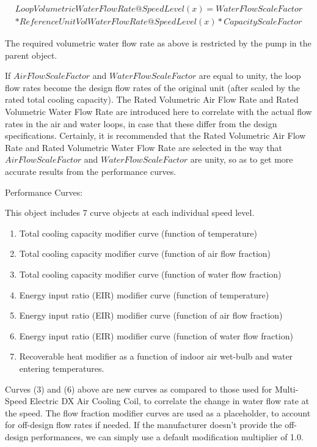 \begin{equation}
\begin{split}
  LoopVolumetricWaterFlowRate@SpeedLevel\left( x \right) = WaterFlowScaleFactor \\
  * ReferenceUnitVolWaterFlowRate@SpeedLevel(x) * CapacityScaleFactor
\end{split}
\end{equation}

The required volumetric water flow rate as above is restricted by the pump in the parent object.

If \(AirFlowScaleFactor\) and \(WaterFlowScaleFactor\) are equal to unity, the loop flow rates become the design flow rates of the original unit (after scaled by the rated total cooling capacity). The Rated Volumetric Air Flow Rate and Rated Volumetric Water Flow Rate are introduced here to correlate with the actual flow rates in the air and water loops, in case that these differ from the design specifications. Certainly, it is recommended that the Rated Volumetric Air Flow Rate and Rated Volumetric Water Flow Rate are selected in the way that \(AirFlowScaleFactor\) and \(WaterFlowScaleFactor\) are unity, so as to get more accurate results from the performance curves.

Performance Curves:

This object includes 7 curve objects at each individual speed level.

\begin{enumerate}
\def\labelenumi{\arabic{enumi})}
\item
  Total cooling capacity modifier curve (function of temperature)
\item
  Total cooling capacity modifier curve (function of air flow fraction)
\item
  Total cooling capacity modifier curve (function of water flow fraction)
\item
  Energy input ratio (EIR) modifier curve (function of temperature)
\item
  Energy input ratio (EIR) modifier curve (function of air flow fraction)
\item
  Energy input ratio (EIR) modifier curve (function of water flow fraction)
\item
  Recoverable heat modifier as a function of indoor air wet-bulb and water entering temperatures.
\end{enumerate}

Curves (3) and (6) above are new curves as compared to those used for Multi-Speed Electric DX Air Cooling Coil, to correlate the change in water flow rate at the speed. The flow fraction modifier curves are used as a placeholder, to account for off-design flow rates if needed. If the manufacturer doesn't provide the off-design performances, we can simply use a default modification multiplier of 1.0.

